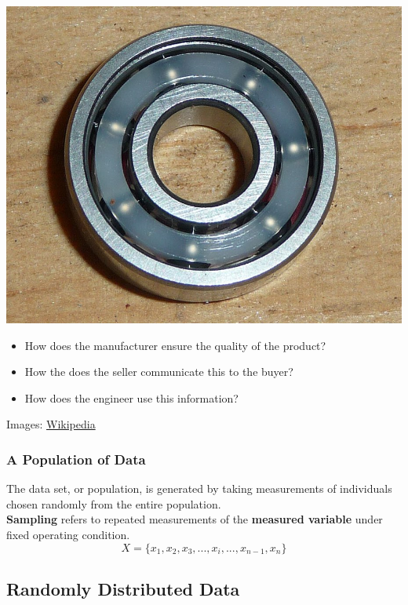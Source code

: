 \documentclass[fleqn]{beamer} %
\newcommand{\sectionIsubsectionItitle}{A Population of Data}
\newcommand{\sectionIsubsectionIItitle}{Randomly Distributed Data}
\begin{document}
\begin{frame}
				\includegraphics[scale=.1]{images/bearing_fig3.jpeg}
				\begin{itemize}		
					\item How does the manufacturer ensure the quality of the product?
					\item How the does the seller communicate this to the buyer?
					\item How does the engineer use this information? 
				\end{itemize}

				{\tiny Images: \href{https://en.wikipedia.org/wiki/Ball_bearing}{Wikipedia} }
							

			\end{frame}

			\begin{frame}
				\frametitle{\sectionIsubsectionItitle}
				\bigskip

				The data set, or population, is generated by taking measurements of individuals chosen randomly from the entire population. \\ 
		 
				 {\bf \RD Sampling} refers to repeated measurements of the {\bf \PR measured variable} under fixed operating condition.	\\
				 
				 \[ X = \{ x_1,x_2,x_3, ... , x_i , ... , x_{n-1}, x_{n} \}  \]

			\end{frame}

		\subsection{\sectionIsubsectionIItitle}\label{sectionIsubsectionII}
\end{document}
